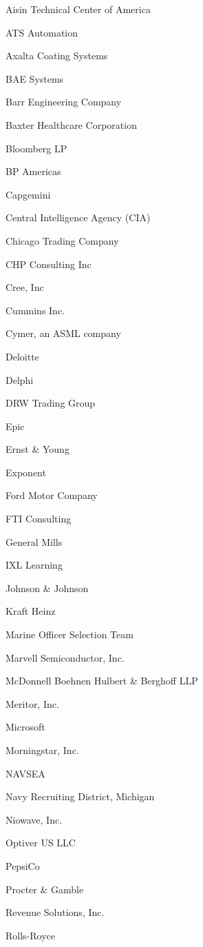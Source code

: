 \documentclass[twoside]{article}
\begin{document}
\begin{center}
\begin{multicols}{5}
\begin{FlushLeft}
\begin{compactitem}
\item Aisin Technical Center of America
\item ATS Automation
\item Axalta Coating Systems
\item BAE Systems
\item Barr Engineering Company
\item Baxter Healthcare Corporation
\item Bloomberg LP
\item BP Americas
\item Capgemini
\item Central Intelligence Agency (CIA)
\item Chicago Trading Company
\item CHP Consulting Inc
\item Cree, Inc
\item Cummins Inc.
\item Cymer, an ASML company
\item Deloitte
\item Delphi
\item DRW Trading Group
\item Epic
\item Ernst \& Young
\item Exponent
\item Ford Motor Company
\item FTI Consulting
\item General Mills
\item IXL Learning
\item Johnson \& Johnson
\item Kraft Heinz
\item Marine Officer Selection Team
\item Marvell Semiconductor, Inc.
\item McDonnell Boehnen Hulbert \& Berghoff LLP
\item Meritor, Inc.
\item Microsoft
\item Morningstar, Inc.
\item NAVSEA
\item Navy Recruiting District, Michigan
\item Niowave, Inc.
\item Optiver US LLC
\item PepsiCo
\item Procter \& Gamble
\item Revenue Solutions, Inc.
\item Rolls-Royce

\end{compactitem}
\end{FlushLeft}
\end{multicols}
\end{center}
\end{document}

